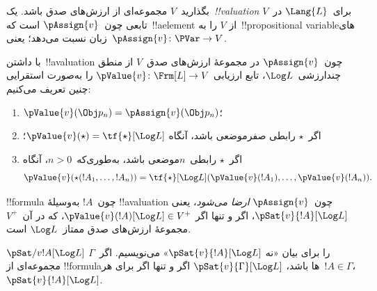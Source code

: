 \documentclass[../../../include/open-logic-section]{subfiles}
\begin{document}


\begin{defn}[!!^{valuation}s] 
بگذارید~$V$ مجموعه‌ای از ارزش‌های صدق باشد. یک~\emph{!!{valuation}}
برای~$\Lang{L}$ در~$V$ تابعی چون~$\pAssign{v}$ است که~!!a{element} از
$V$ را به~!!{propositional variable}های زبان نسبت می‌دهد؛
یعنی~$\pAssign{v} \colon \PVar \to V$.
\end{defn}

\begin{defn}
  با داشتن~!!a{valuation} چون~$\pAssign{v}$ در مجموعهٔ ارزش‌های صدق~$V$
  از منطق چندارزشی~$\Log L$، تابع ارزیابی
  $\pValue{v} \colon \Frm[L] \to V$ را به‌صورت استقرایی چنین تعریف
  می‌کنیم:
  \begin{enumerate}
    \item $\pValue{v}(\Obj p_n) = \pAssign{v}(\Obj p_n)$؛
    \item اگر~$\star$ رابطی صفرموضعی باشد، آنگاه
    $\pValue{v}(\star)  = \tf{\star}[\Log L]$؛
    \item اگر~$\star$ رابطی~$n$موضعی باشد، به‌طوری‌که~$n>0$، آنگاه
    \[
      \pValue{v}(\star(!A_1, \dots, !A_n)) = \tf{\star}[\Log L]
      (\pValue{v}(!A_1), \dots, \pValue{v}(!A_n)).
    \]
  \end{enumerate}
\end{defn}

\begin{defn}[ارضا]
 !!{formula} چون~$!A$ به‌وسیلهٔ
!!a{valuation} چون~$\pAssign{v}$ \emph{ارضا می‌شود}، یعنی
$\pSat{v}{!A}[\Log L]$، اگر و تنها اگر
$\pValue{v}(!A)[\Log L] \in V^+$، که در آن~$V^+$ مجموعهٔ ارزش‌های صدق
ممتاز~$\Log L$ است.
  
  $\pSat/{v}{!A}[\Log L]$ را برای بیان «نه
  $\pSat{v}{!A}[\Log L]$» می‌نویسیم. اگر~$\Gamma$ مجموعه‌ای از
  !!{formula}ها باشد، $\pSat{v}{\Gamma}[\Log L]$ اگر و تنها اگر برای
  هر~$!A \in \Gamma$، $\pSat{v}{!A}[\Log L]$.
\end{defn}
\end{document}

